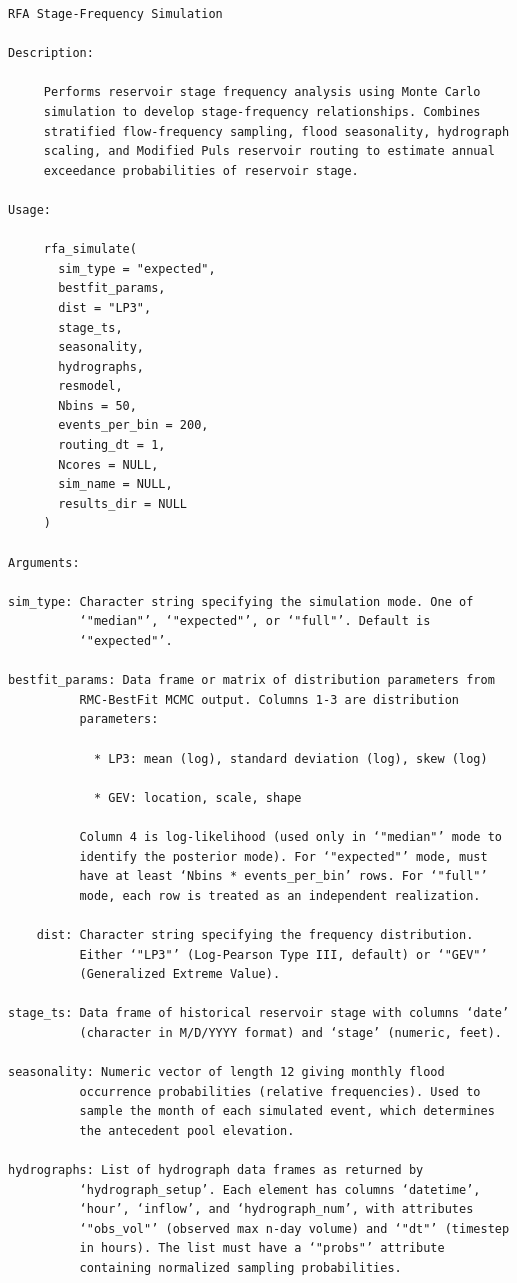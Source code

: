 \documentclass[
  letterpaper,
  DIV=11,
  numbers=noendperiod]{scrreprt}
\begin{document}
\begin{verbatim}
RFA Stage-Frequency Simulation

Description:

     Performs reservoir stage frequency analysis using Monte Carlo
     simulation to develop stage-frequency relationships. Combines
     stratified flow-frequency sampling, flood seasonality, hydrograph
     scaling, and Modified Puls reservoir routing to estimate annual
     exceedance probabilities of reservoir stage.

Usage:

     rfa_simulate(
       sim_type = "expected",
       bestfit_params,
       dist = "LP3",
       stage_ts,
       seasonality,
       hydrographs,
       resmodel,
       Nbins = 50,
       events_per_bin = 200,
       routing_dt = 1,
       Ncores = NULL,
       sim_name = NULL,
       results_dir = NULL
     )
     
Arguments:

sim_type: Character string specifying the simulation mode. One of
          ‘"median"’, ‘"expected"’, or ‘"full"’. Default is
          ‘"expected"’.

bestfit_params: Data frame or matrix of distribution parameters from
          RMC-BestFit MCMC output. Columns 1-3 are distribution
          parameters:

            * LP3: mean (log), standard deviation (log), skew (log)

            * GEV: location, scale, shape

          Column 4 is log-likelihood (used only in ‘"median"’ mode to
          identify the posterior mode). For ‘"expected"’ mode, must
          have at least ‘Nbins * events_per_bin’ rows. For ‘"full"’
          mode, each row is treated as an independent realization.

    dist: Character string specifying the frequency distribution.
          Either ‘"LP3"’ (Log-Pearson Type III, default) or ‘"GEV"’
          (Generalized Extreme Value).

stage_ts: Data frame of historical reservoir stage with columns ‘date’
          (character in M/D/YYYY format) and ‘stage’ (numeric, feet).

seasonality: Numeric vector of length 12 giving monthly flood
          occurrence probabilities (relative frequencies). Used to
          sample the month of each simulated event, which determines
          the antecedent pool elevation.

hydrographs: List of hydrograph data frames as returned by
          ‘hydrograph_setup’. Each element has columns ‘datetime’,
          ‘hour’, ‘inflow’, and ‘hydrograph_num’, with attributes
          ‘"obs_vol"’ (observed max n-day volume) and ‘"dt"’ (timestep
          in hours). The list must have a ‘"probs"’ attribute
          containing normalized sampling probabilities.


\end{verbatim}
\end{document}
